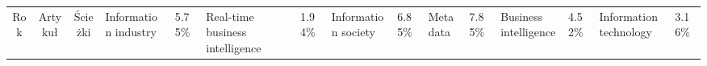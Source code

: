\begin{tabular}{|c|c|c|}
	\hline
	Rok &	Artykuł &	Ścieżki  &	Information industry &	5.75\%  &	Real-time business intelligence &	1.94\%  &	Information society &	6.85\%  &	Metadata &	7.85\%  &	Business intelligence &	4.52\%  &	Information technology &	3.16\% \nl
\end{tabular}